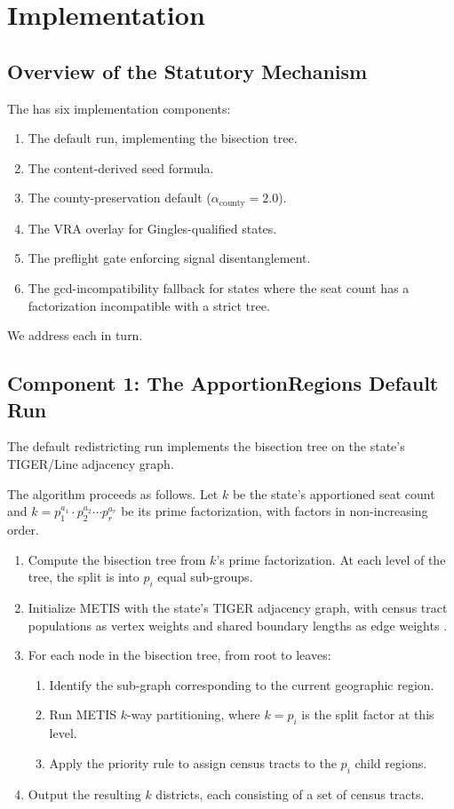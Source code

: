 \section{Implementation}
\label{sec:implementation}

\subsection{Overview of the Statutory Mechanism}

The \dia{} has six implementation components:
\begin{enumerate}
  \item The \ar{} default run, implementing the \hh{} bisection tree.
  \item The content-derived seed formula.
  \item The county-preservation default ($\alpha_\text{county} = 2.0$).
  \item The VRA overlay for Gingles-qualified states.
  \item The \callais{} preflight gate enforcing signal disentanglement.
  \item The gcd-incompatibility fallback for states where the seat count
    has a factorization incompatible with a strict \hh{} tree.
\end{enumerate}

We address each in turn.

\subsection{Component 1: The ApportionRegions Default Run}

The default redistricting run implements the \hh{} bisection tree on the
state's TIGER/Line adjacency graph.

The algorithm proceeds as follows.
Let $k$ be the state's apportioned seat count and $k = p_1^{a_1} \cdot p_2^{a_2} \cdots p_r^{a_r}$
be its prime factorization, with factors in non-increasing order.
\begin{enumerate}
  \item Compute the \hh{} bisection tree from $k$'s prime factorization.
    At each level of the tree, the split is into $p_i$ equal sub-groups.
  \item Initialize METIS with the state's TIGER adjacency graph, with census
    tract populations as vertex weights and shared boundary lengths as
    edge weights \citep{b2paper}.
  \item For each node in the bisection tree, from root to leaves:
    \begin{enumerate}
      \item Identify the sub-graph corresponding to the current geographic region.
      \item Run METIS $k$-way partitioning, where $k = p_i$ is the split factor
        at this level.
      \item Apply the \hh{} priority rule to assign census tracts to the $p_i$
        child regions.
    \end{enumerate}
  \item Output the resulting $k$ districts, each consisting of a set of
    census tracts.
\end{enumerate}

